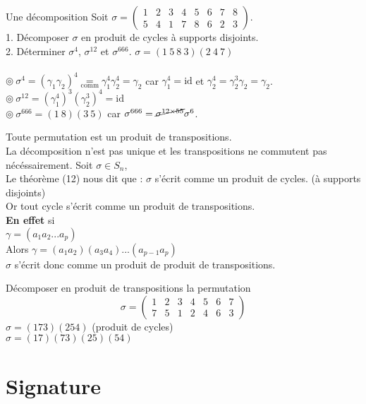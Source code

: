 \documentclass[11pt]{article}
\newcommand*{\id}{\text{id}}
\newcommand*{\n}{\\[0.2cm]}
\newcommand{\0}{\varnothing}
\newcommand*{\g}{\gamma}
\newcommand*{\s}{\sigma}
\begin{document}
\begin{ex}{Une décomposition}{}
    Soit $\s=\begin{pmatrix}1&2&3&4&5&6&7&8\\5&4&1&7&8&6&2&3\end{pmatrix}$.\\
    1. Décomposer $\s$ en produit de cycles à supports disjoints.\\
    2. Déterminer $\s^4$, $\s^{12}$ et $\s^{666}$.
    \tcblower
     $\s=(1~5~8~3)(2~4~7)$\\
    \\
    $\circledcirc ~ \s^4=(\g_1\g_2)^4\underset{\text{comm}}{=}\g_1^4\g_2^4=\g_2$ car $\g_1^4=\id$ et $\g_2^4=\g_2^3\g_2=\g_2$.\\
    $\circledcirc ~ \s^{12}=(\gamma_1^{4})^3(\g_2^3)^4=\id$\\
    $\circledcirc ~ \s^{666}=(1~8)(3~5)$ car $\s^{666}=\cancel{\s^{12\times55}}\s^6$.
\end{ex}

\begin{corr}{}{}
    Toute permutation est un produit de transpositions.\n
    La décomposition n'est pas unique et les transpositions ne commutent pas nécéssairement.
    \tcblower
    Soit $\s \in S_{n}$, \n 
    Le théorème (12) nous dit que : $\s$ s'écrit comme un produit de cycles. (à supports disjoints)\n
    Or tout cycle s'écrit comme un produit de transpositions.\n
    \textbf{En effet} si \n
    $\g = (a_{1} a_{2}  ...  a_{p})$\n
    Alors $\g = (a_{1} a_{2})(a_{3} a_{4}) ... (a_{p-1} a_{p})$\n
    $\s$ s'écrit donc comme un produit de produit de transpositions.
\end{corr}

\begin{ex}{}{}
    Décomposer en produit de transpositions la permutation \n
    \begin{equation*}
        \s = \begin{pmatrix}
            1 & 2 & 3 & 4 & 5 & 6 & 7 \n
            7 & 5 & 1 & 2 & 4 & 6 & 3
        \end{pmatrix}
    \end{equation*}
    \tcblower
    $\s = (1 7 3) (2 5 4)$ (produit de cycles)\n
    $\s = (1 7)(7 3)(2 5)(5 4)$
\end{ex}

\section{Signature}
\end{document}
